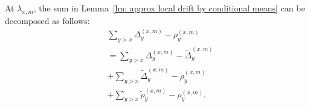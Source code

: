 \documentclass[twoside,12pt,a4paper]{article}
\numberwithin{equation}{section}
\begin{document}
	At $\lambda_{x, m}$, the sum in Lemma~\ref{lm: approx local drift by conditional means} can be decomposed as follows:
	\begin{align}
		\label{eqn:tempered-difference-0}
		&\sum_{y > x} \Delta_y^{(x,m)} -  \rho_y^{(x,m)}  \\
		\label{eqn:tempered-difference-1}
		&= \sum_{y > x} \Delta_y^{(x,m)} - \tilde\Delta_y^{(x,m)} \\
		\label{eqn:tempered-difference-2}
		&+ \sum_{y > x} \tilde \Delta_{y}^{(x,m)} - \tilde\rho_y^{(x,m)} \\
		\label{eqn:tempered-difference-3}
		&+ \sum_{y > x} \tilde\rho_y^{(x,m)} - \rho_y^{(x,m)} 
		.\end{align}
	
\end{document}
